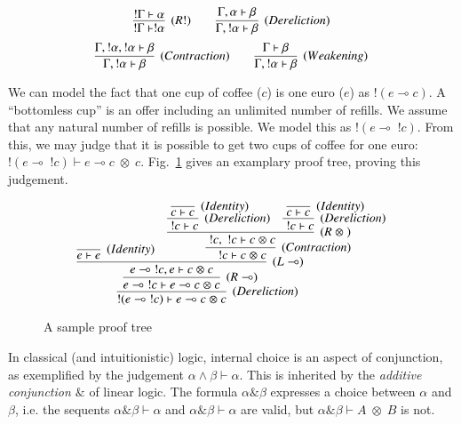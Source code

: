 \documentclass[acmtocl]{acmtrans2m}
\newcommand{\x}{{\;\otimes\;}}
\newcommand{\lp}{\multimap}
\newcommand{\bang}{\; !}
\begin{document}
\[
\infer[(R!)]{!\Gamma\vdash!\alpha}
    {!\Gamma\vdash\alpha}
\quad\quad
\infer[(Dereliction)]{\Gamma,!\alpha\vdash\beta}
    {\Gamma,\alpha\vdash\beta}
\]
\[
\infer[(Contraction)]{\Gamma,!\alpha\vdash\beta}
    {\Gamma,!\alpha,!\alpha\vdash\beta}
\quad\quad
\infer[(Weakening)]{\Gamma,!\alpha\vdash\beta}
    {\Gamma\vdash\beta}
\]

\begin{example}
We can model the fact that one cup of coffee ($c$) is one euro ($e$) as $!(e\lp
c)$. A ``bottomless cup'' is an offer including an unlimited number of refills.
We assume that any natural number of refills is possible. We model this as
$!(e\lp\bang c)$. From this, we may judge that it is possible to get two cups of
coffee for one euro: $!(e\lp\bang c)\vdash e\lp c\x c$.
Fig.~\ref{fig:coffee-example} gives an examplary proof tree, proving this
judgement.

\begin{figure}
\label{fig:coffee-example}
\begin{center}
\[
\infer[(Dereliction)]
{
  !(e\lp\bang c)\vdash e\lp c\x c
}
{
  \infer[(R\lp)]
  {
    e\lp\bang c\vdash e\lp c\x c
  }
  {
    \infer[(L\lp)]
    {
      e\lp\bang c,e\vdash c\x c
    }
    {
      \infer[(Identity)]
      {
        e\vdash e
      }
      {
      }
    &
      \infer[(Contraction)]
      {
        \bang c\vdash c\x c
      }
      {
        \infer[(R\x)]
        {
          \bang c,\bang c\vdash c\x c
        }
        {
          \infer[(Dereliction)]
          {
            \bang c\vdash c
          }
          {
            \infer[(Identity)]
            {
              c\vdash c
            }
            {
            }
          }
        &
          \infer[(Dereliction)]
          {
            \bang c\vdash c
          }
          {
            \infer[(Identity)]
            {
              c\vdash c
            }
            {
            }
          }
        }
      }
    }
  }
}
\]
\end{center}
\caption{A sample proof tree}
\end{figure}
\end{example}

In classical (and intuitionistic) logic, internal choice is an aspect of
conjunction, as exemplified by the judgement $\alpha\wedge\beta\vdash\alpha$.
This is inherited by the \textit{additive conjunction $\&$} of linear logic. The
formula $\alpha\&\beta$ expresses a choice between $\alpha$ and $\beta$, i.e. the
sequents $\alpha\&\beta\vdash\alpha$ and $\alpha\&\beta\vdash\alpha$ are valid,
but $\alpha\&\beta\vdash A\x B$ is not.
\end{document}
